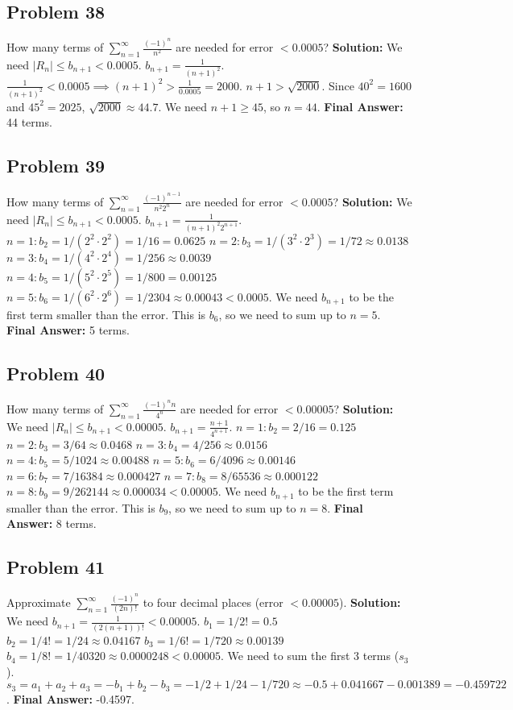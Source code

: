 \documentclass{article}
\begin{document}
\subsection*{Problem 38}
How many terms of $\sum_{n=1}^{\infty} \frac{(-1)^n}{n^2}$ are needed for error $< 0.0005$?
\textbf{Solution:} We need $|R_n| \le b_{n+1} < 0.0005$.
$b_{n+1} = \frac{1}{(n+1)^2}$.
$\frac{1}{(n+1)^2} < 0.0005 \implies (n+1)^2 > \frac{1}{0.0005} = 2000$.
$n+1 > \sqrt{2000}$. Since $40^2=1600$ and $45^2=2025$, $\sqrt{2000} \approx 44.7$.
We need $n+1 \ge 45$, so $n=44$.
\textbf{Final Answer:} 44 terms.

\subsection*{Problem 39}
How many terms of $\sum_{n=1}^{\infty} \frac{(-1)^{n-1}}{n^2 2^n}$ are needed for error $< 0.0005$?
\textbf{Solution:} We need $|R_n| \le b_{n+1} < 0.0005$.
$b_{n+1} = \frac{1}{(n+1)^2 2^{n+1}}$.
$n=1: b_2 = 1/(2^2 \cdot 2^2) = 1/16 = 0.0625$
$n=2: b_3 = 1/(3^2 \cdot 2^3) = 1/72 \approx 0.0138$
$n=3: b_4 = 1/(4^2 \cdot 2^4) = 1/256 \approx 0.0039$
$n=4: b_5 = 1/(5^2 \cdot 2^5) = 1/800 = 0.00125$
$n=5: b_6 = 1/(6^2 \cdot 2^6) = 1/2304 \approx 0.00043 < 0.0005$.
We need $b_{n+1}$ to be the first term smaller than the error. This is $b_6$, so we need to sum up to $n=5$.
\textbf{Final Answer:} 5 terms.

\subsection*{Problem 40}
How many terms of $\sum_{n=1}^{\infty} \frac{(-1)^n n}{4^n}$ are needed for error $< 0.00005$?
\textbf{Solution:} We need $|R_n| \le b_{n+1} < 0.00005$.
$b_{n+1} = \frac{n+1}{4^{n+1}}$.
$n=1: b_2 = 2/16 = 0.125$
$n=2: b_3 = 3/64 \approx 0.0468$
$n=3: b_4 = 4/256 \approx 0.0156$
$n=4: b_5 = 5/1024 \approx 0.00488$
$n=5: b_6 = 6/4096 \approx 0.00146$
$n=6: b_7 = 7/16384 \approx 0.000427$
$n=7: b_8 = 8/65536 \approx 0.000122$
$n=8: b_9 = 9/262144 \approx 0.000034 < 0.00005$.
We need $b_{n+1}$ to be the first term smaller than the error. This is $b_9$, so we need to sum up to $n=8$.
\textbf{Final Answer:} 8 terms.

\subsection*{Problem 41}
Approximate $\sum_{n=1}^{\infty} \frac{(-1)^n}{(2n)!}$ to four decimal places (error $< 0.00005$).
\textbf{Solution:} We need $b_{n+1} = \frac{1}{(2(n+1))!} < 0.00005$.
$b_1 = 1/2! = 0.5$
$b_2 = 1/4! = 1/24 \approx 0.04167$
$b_3 = 1/6! = 1/720 \approx 0.00139$
$b_4 = 1/8! = 1/40320 \approx 0.0000248 < 0.00005$.
We need to sum the first 3 terms ($s_3$).
$s_3 = a_1 + a_2 + a_3 = -b_1 + b_2 - b_3 = -1/2 + 1/24 - 1/720 \approx -0.5 + 0.041667 - 0.001389 = -0.459722$.
\textbf{Final Answer:} -0.4597.
\end{document}

